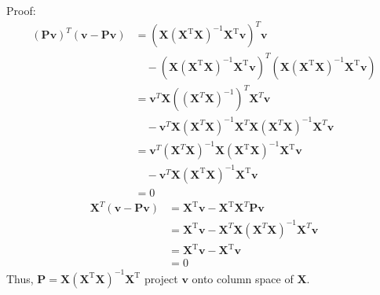 \documentclass[a4paper]{article}
\begin{document}
\begin{enumerate}
  Proof:
  \begin{equation*}
    \begin{aligned}
      (\boldsymbol{P} \boldsymbol{v})^T (\boldsymbol{v}-\boldsymbol{P} \boldsymbol{v})
      &= (\boldsymbol{X}\left(\boldsymbol{X}^{\mathrm{T}} \boldsymbol{X}\right)^{-1} \boldsymbol{X}^{\mathrm{T}}\boldsymbol{v})^T \boldsymbol{v}\\
      &\quad - (\boldsymbol{X}\left(\boldsymbol{X}^{\mathrm{T}} \boldsymbol{X}\right)^{-1} \boldsymbol{X}^{\mathrm{T}}\boldsymbol{v})^T(\boldsymbol{X}\left(\boldsymbol{X}^{\mathrm{T}} \boldsymbol{X}\right)^{-1} \boldsymbol{X}^{\mathrm{T}}\boldsymbol{v})\\
      &=\boldsymbol{v}^T \boldsymbol{X} ((\boldsymbol{X}^T \boldsymbol{X})^{-1})^T \boldsymbol{X}^T \boldsymbol{v} \\
      &\quad -\boldsymbol{v}^T \boldsymbol{X} (\boldsymbol{X}^T \boldsymbol{X})^{-1} \boldsymbol{X}^T \boldsymbol{X} (\boldsymbol{X}^T \boldsymbol{X})^{-1} \boldsymbol{X}^T \boldsymbol{v}\\
      &=\boldsymbol{v}^T (\boldsymbol{X}^T \boldsymbol{X})^{-1} \boldsymbol{X}\left(\boldsymbol{X}^{\mathrm{T}} \boldsymbol{X}\right)^{-1} \boldsymbol{X}^{\mathrm{T}}\boldsymbol{v}\\ 
      &\quad -\boldsymbol{v}^T \boldsymbol{X}\left(\boldsymbol{X}^{\mathrm{T}} \boldsymbol{X}\right)^{-1} \boldsymbol{X}^{\mathrm{T}}\boldsymbol{v}\\
      &=0
    \end{aligned}
  \end{equation*}
  \begin{equation*}
    \begin{aligned}
      \boldsymbol{X}^T (\boldsymbol{v}-\boldsymbol{P} \boldsymbol{v})
      &= \boldsymbol{X}^{\mathrm{T}} \boldsymbol{v} - \boldsymbol{X}^{\mathrm{T}} \boldsymbol{X}^T \boldsymbol{P} \boldsymbol{v}\\
      &=\boldsymbol{X}^{\mathrm{T}} \boldsymbol{v} - \boldsymbol{X}^T \boldsymbol{X} (\boldsymbol{X}^T \boldsymbol{X})^{-1} \boldsymbol{X}^T \boldsymbol{v}\\
      &=\boldsymbol{X}^{\mathrm{T}} \boldsymbol{v} - \boldsymbol{X}^{\mathrm{T}} \boldsymbol{v}\\
      &=0
    \end{aligned}
  \end{equation*}
Thus, $\boldsymbol{P} = \boldsymbol{X}\left(\boldsymbol{X}^{\mathrm{T}} \boldsymbol{X}\right)^{-1} \boldsymbol{X}^{\mathrm{T}}$ project $\boldsymbol{v}$ onto column space of $\boldsymbol{X}$.


\end{enumerate}
\end{document}

